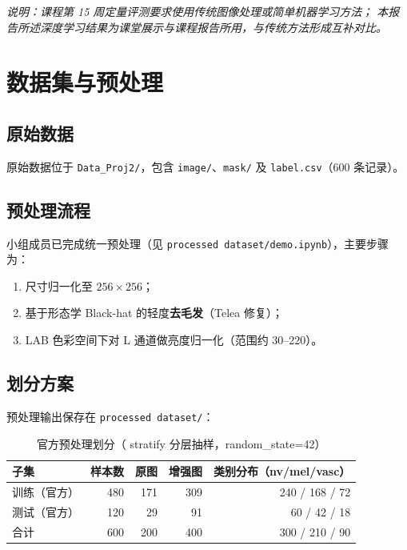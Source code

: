 \documentclass[12pt,a4paper]{ctexart}
\begin{document}
\textit{说明：课程第 15 周定量评测要求使用传统图像处理或简单机器学习方法；
本报告所述深度学习结果为课堂展示与课程报告所用，与传统方法形成互补对比。}

\section{数据集与预处理}

\subsection{原始数据}
原始数据位于 \texttt{Data\_Proj2/}，包含 \texttt{image/}、\texttt{mask/} 及
\texttt{label.csv}（600 条记录）。

\subsection{预处理流程}
小组成员已完成统一预处理（见 \texttt{processed dataset/demo.ipynb}），主要步骤为：
\begin{enumerate}
  \item 尺寸归一化至 $256\times256$；
  \item 基于形态学 Black-hat 的轻度\textbf{去毛发}（Telea 修复）；
  \item LAB 色彩空间下对 L 通道做亮度归一化（范围约 30--220）。
\end{enumerate}

\subsection{划分方案}
预处理输出保存在 \texttt{processed dataset/}：
\begin{table}[H]
  \centering
  \caption{官方预处理划分（ stratify 分层抽样，random\_state=42）}
  \label{tab:data_split}
  \begin{tabular}{lrrrr}
    \toprule
    子集 & 样本数 & 原图 & 增强图 & 类别分布（nv/mel/vasc） \\
    \midrule
    训练（官方） & 480 & 171 & 309 & 240 / 168 / 72 \\
    测试（官方） & 120 & 29  & 91  & 60 / 42 / 18 \\
    合计         & 600 & 200 & 400 & 300 / 210 / 90 \\
    \bottomrule
  \end{tabular}
\end{table}
\end{document}
